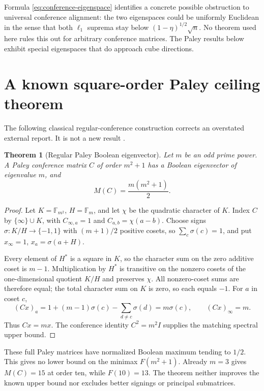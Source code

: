 \documentclass[11pt]{article}
\newtheorem{theorem}{Theorem}
\newcommand{\eps}{\{-1,1\}}
\begin{document}
Formula \eqref{eq:conference-eigenspace} identifies a concrete possible
obstruction to universal conference alignment: the two eigenspaces could be
uniformly Euclidean in the sense that both $\ell_1$ suprema stay below
$(1-\eta)^{1/2}\sqrt n$.  No theorem used here rules this out for arbitrary
conference matrices.  The Paley results below exhibit special eigenspaces
that do approach cube directions.

\section{A known square-order Paley ceiling theorem}

The following classical regular-conference construction corrects an
overstated external report.  It is not a new result
\cite{seidel-two-graphs,craigen-regular}.

\begin{theorem}[Regular Paley Boolean eigenvector]
\label{thm:paley-boolean}
Let $m$ be an odd prime power.  A Paley conference matrix $C$ of order
$m^2+1$ has a Boolean eigenvector of eigenvalue $m$, and
\[
 M(C)=\frac{m(m^2+1)}2.
\]
\end{theorem}

\begin{proof}
Let $K=\mathbb F_{m^2}$, $H=\mathbb F_m$, and let $\chi$ be the quadratic
character of $K$.  Index $C$ by $\{\infty\}\cup K$, with
$C_{\infty,a}=1$ and $C_{a,b}=\chi(a-b)$.  Choose signs
$\sigma:K/H\to\eps$ with $(m+1)/2$ positive cosets, so
$\sum_c\sigma(c)=1$, and put $x_\infty=1$, $x_a=\sigma(a+H)$.

Every element of $H^*$ is a square in $K$, so the character sum on the zero
additive coset is $m-1$.  Multiplication by $H^*$ is transitive on the
nonzero cosets of the one-dimensional quotient $K/H$ and preserves $\chi$.
All nonzero-coset sums are therefore equal; the total character sum on $K$ is
zero, so each equals $-1$.  For $a$ in coset $c$,
\[
 (Cx)_a=1+(m-1)\sigma(c)-\sum_{d\ne c}\sigma(d)=m\sigma(c),
 \qquad (Cx)_\infty=m.
\]
Thus $Cx=mx$.  The conference identity $C^2=m^2I$ supplies the matching
spectral upper bound.
\end{proof}

These full Paley matrices have normalized Boolean maximum tending to $1/2$.
This gives no lower bound on the minimax $F(m^2+1)$.  Already $m=3$ gives
$M(C)=15$ at order ten, while $F(10)=13$.  The theorem neither improves the
known upper bound nor excludes better signings or principal submatrices.
\end{document}
